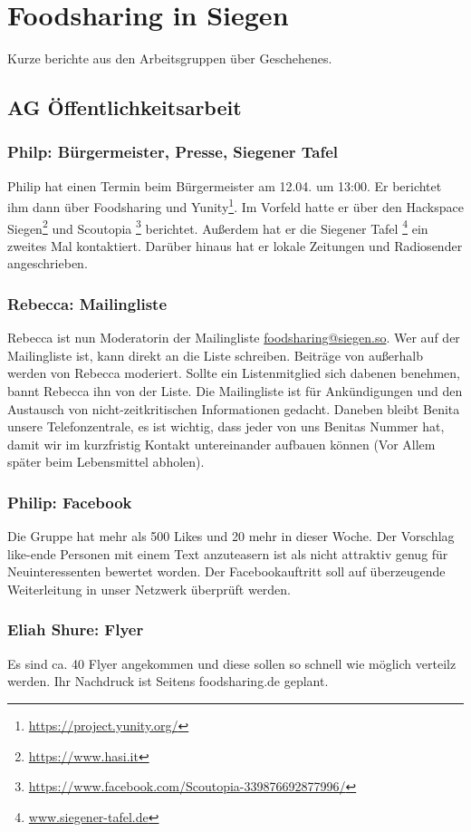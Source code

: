 \documentclass{scrreprt}
\begin{document}
\chapter{Foodsharing in Siegen}
Kurze berichte aus den Arbeitsgruppen über Geschehenes.
\section {AG Öffentlichkeitsarbeit}
\subsection{Philp: Bürgermeister, Presse, Siegener Tafel}
Philip hat einen Termin beim Bürgermeister am 12.04. um 13:00. Er berichtet ihm dann über Foodsharing und Yunity\footnote{\url{https://project.yunity.org/}}. Im Vorfeld hatte er über den Hackspace Siegen\footnote{\url{https://www.hasi.it}} und Scoutopia \footnote{\url{https://www.facebook.com/Scoutopia-339876692877996/}} berichtet. Außerdem hat er die Siegener Tafel \footnote{\url{www.siegener-tafel.de}} ein zweites Mal kontaktiert. Darüber hinaus hat er lokale Zeitungen und Radiosender angeschrieben.
\subsection{Rebecca: Mailingliste}
Rebecca ist nun Moderatorin der Mailingliste \url{foodsharing@siegen.so}. Wer auf der Mailingliste ist, kann direkt an die Liste schreiben. Beiträge von außerhalb werden von Rebecca moderiert. Sollte ein Listenmitglied sich dabenen benehmen, bannt Rebecca ihn von der Liste. Die Mailingliste ist für Ankündigungen und den Austausch von nicht-zeitkritischen Informationen gedacht. Daneben bleibt Benita unsere Telefonzentrale, es ist wichtig, dass jeder von uns Benitas Nummer hat, damit wir im kurzfristig Kontakt untereinander aufbauen können (Vor Allem später beim Lebensmittel abholen).
\subsection{Philip: Facebook}
Die Gruppe hat mehr als 500 Likes und 20 mehr in dieser Woche. Der Vorschlag like-ende Personen mit einem Text anzuteasern ist als nicht attraktiv genug für Neuinteressenten bewertet worden. Der Facebookauftritt soll auf überzeugende Weiterleitung in unser Netzwerk überprüft werden.
\subsection{Eliah Shure: Flyer}
Es sind ca. 40 Flyer angekommen und diese sollen so schnell wie möglich verteilz werden. Ihr Nachdruck ist Seitens foodsharing.de geplant. 
\end{document}

